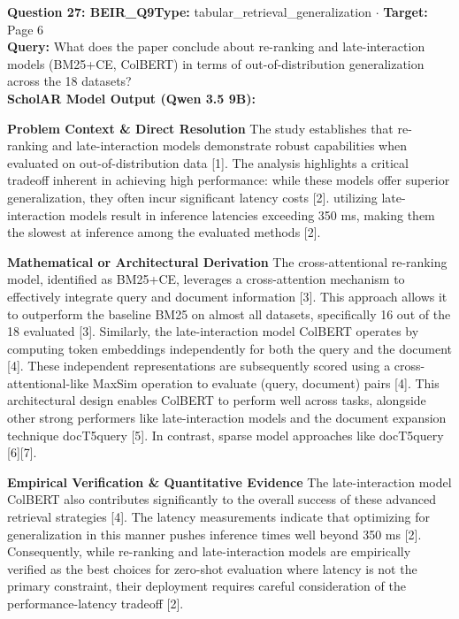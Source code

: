 \documentclass[10pt,a4paper]{article}
\begin{document}
\begin{tcolorbox}[questionbox]
{\noindent\bfseries\large\color{navy} Question 27: BEIR\_Q9}\hfill {\footnotesize\color{darkteal}\textbf{Type:} tabular\_retrieval\_generalization $\cdot$ \textbf{Target:} Page 6}\\[4pt]
{\noindent\bfseries\color{accentblue} Query: } What does the paper conclude about re-ranking and late-interaction models (BM25+CE, ColBERT) in terms of out-of-distribution generalization across the 18 datasets?\\[6pt]
{\noindent\bfseries\color{navy} ScholAR Model Output (Qwen 3.5 9B):}\\[2pt]
{\small \textbf{Problem Context \& Direct Resolution} The study establishes that re-ranking and late-interaction models demonstrate robust capabilities when evaluated on out-of-distribution data [1].  The analysis highlights a critical tradeoff inherent in achieving high performance: while these models offer superior generalization, they often incur significant latency costs [2]. utilizing late-interaction models result in inference latencies exceeding 350 ms, making them the slowest at inference among the evaluated methods [2].\par\vspace{3pt}\textbf{Mathematical or Architectural Derivation} The cross-attentional re-ranking model, identified as BM25+CE, leverages a cross-attention mechanism to effectively integrate query and document information [3]. This approach allows it to outperform the baseline BM25 on almost all datasets, specifically 16 out of the 18 evaluated [3]. Similarly, the late-interaction model ColBERT operates by computing token embeddings independently for both the query and the document [4]. These independent representations are subsequently scored using a cross-attentional-like MaxSim operation to evaluate (query, document) pairs [4]. This architectural design enables ColBERT to perform well across tasks, alongside other strong performers like late-interaction models and the document expansion technique docT5query [5]. In contrast, sparse model approaches like docT5query [6][7].\par\vspace{3pt}\textbf{Empirical Verification \& Quantitative Evidence} The late-interaction model ColBERT also contributes significantly to the overall success of these advanced retrieval strategies [4].  The latency measurements indicate that optimizing for generalization in this manner pushes inference times well beyond 350 ms [2]. Consequently, while re-ranking and late-interaction models are empirically verified as the best choices for zero-shot evaluation where latency is not the primary constraint, their deployment requires careful consideration of the performance-latency tradeoff [2].}\\[6pt]

\end{tcolorbox}
\end{document}
